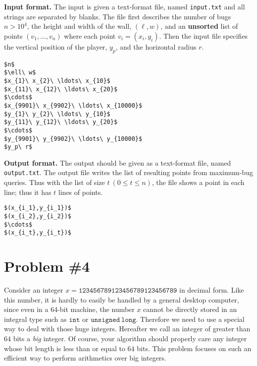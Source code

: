 \documentclass{article}
\begin{document}
\bigskip
\noindent\textbf{Input format.} %
The input is given a text-format file, named \texttt{input.txt} and all strings are separated by blanks.
The file first describes the number of bugs $n>10^{4}$, the height and width of the wall, $(\ell,w)$, 
and an \textbf{unsorted} list of points $(v_1,\ldots,v_n)$ where each point $v_i=(x_i,y_i)$.
Then the input file specifies the vertical position of the player, $y_p$, and the horizontal radius $r$.


\begin{lstlisting}[backgroundcolor=\color{yellow!40}]
$n$
$\ell\ w$
$x_{1}\ x_{2}\ \ldots\ x_{10}$
$x_{11}\ x_{12}\ \ldots\ x_{20}$
$\cdots$
$x_{9901}\ x_{9902}\ \ldots\ x_{10000}$
$y_{1}\ y_{2}\ \ldots\ y_{10}$
$y_{11}\ y_{12}\ \ldots\ y_{20}$
$\cdots$
$y_{9901}\ y_{9902}\ \ldots\ y_{10000}$
$y_p\ r$
\end{lstlisting}



\bigskip
\noindent\textbf{Output format.} %
The output should be given as a text-format file, named \texttt{output.txt}.
The output file writes the list of resulting points from maximum-bug queries.
Thus with the list of size $t\ (0\leq t\leq n)$, the file shows 
a point in each line; thus it has $t$ lines of points. 

\begin{lstlisting}[backgroundcolor=\color{yellow!40}]
$(x_{i_1},y_{i_1})$
$(x_{i_2},y_{i_2})$
$\cdots$
$(x_{i_t},y_{i_t})$
\end{lstlisting}

% 
\newpage
\section*{Problem \#4} 

Consider an integer $x=\mathtt{123456789123456789123456789}$ in decimal form.
Like this number, it is hardly to easily be handled by a general desktop computer,
since even in a 64-bit machine, the number $x$ cannot be directly stored in an integral type such as $\mathtt{int}$ or $\mathtt{unsigned\ long}$.
Therefore we need to use a special way to deal with those huge integers. Hereafter we call an integer of greater than $64$ bits a \emph{big} integer.
Of course, your algorithm should properly care any integer whose bit length is less than or equal to $64$ bits.
This problem focuses on such an efficient way to perform arithmetics over big integers.
\end{document}
